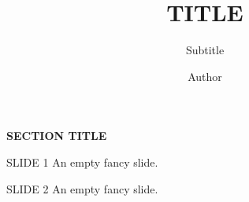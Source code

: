 \documentclass[10pt,aspectratio=169]{beamer}
\title{TITLE}
\subtitle{Subtitle}
\author{Author}
\institute{Affiliation}
\begin{document}
{
	\begin{frame}
		\titlepage
	\end{frame}
}

\begin{SectionTitle}
\begin{frame}
	\centering
	\vspace{0.1\textheight}
	\textbf{\LARGE SECTION TITLE}
\end{frame}
\end{SectionTitle}

\begin{frame}{SLIDE 1}
	An empty fancy slide.
\end{frame}

\begin{frame}{SLIDE 2}
	An empty fancy slide.
\end{frame}
\end{document}
